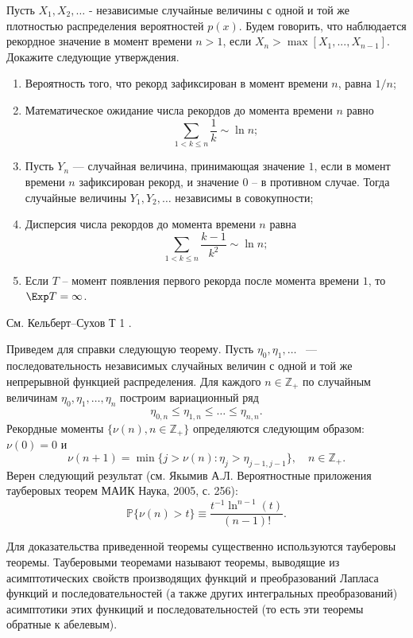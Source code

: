 \begin{problem}[Рекорды]
Пусть $X_1 ,X_2 ,\ldots $ - независимые 
случайные величины с одной и той же плотностью распределения вероятностей 
$p(x)$. Будем говорить, что наблюдается рекордное значение в момент времени 
$n>1$, если $X_n >\max \left[ {X_1 ,...,X_{n-1} } \right]$. Докажите 
следующие утверждения.

\begin{enumerate}
\item Вероятность того, что рекорд зафиксирован в момент времени $n$, 
равна $1/n$;

\item Математическое ожидание числа рекордов до момента времени $n$ 
равно 
\[
\sum\limits_{1<k\le n} {\frac{1}{k}} \sim \ln n;
\]

\item Пусть $Y_n $ --- случайная величина, принимающая значение $1$, если 
в момент времени $n$ зафиксирован рекорд, и значение $0$ -- в противном случае. 
Тогда случайные величины $Y_1 ,Y_2 ,\ldots$ независимы в совокупности;

\item Дисперсия числа рекордов до момента времени $n$ равна
\[
\sum\limits_{1<k\le n} {\frac{k-1}{k^2}} \sim \ln n;
\]

\item Если $T$ -- момент появления первого рекорда после момента времени $1$, то $\Exp T= \infty$.
\end{enumerate}
\end{problem}

\begin{ordre}
См. Кельберт--Сухов Т 1 \cite{4}.
\end{ordre}

\begin{remark}
Приведем для справки следующую теорему. Пусть $\eta_0,\eta_1,\dots$ ~--- последовательность независимых случайных величин с одной и той же непрерывной функцией распределения. Для каждого $n\in \mathbb{Z}_{+}$ по случайным величинам $\eta_0,\eta_1,\dots,\eta_n$ построим вариационный ряд 
$$\eta_{0,n}\leq \eta_{1,n}\leq\dots\leq\eta_{n,n}.$$
Рекордные моменты $\{\nu(n),n\in\mathbb{Z}_{+}\}$ определяются следующим образом: $\nu(0) = 0$ и
$$\nu(n+1)=\min\{j>\nu(n): \eta_j>\eta_{j-1,j-1}\},\quad n\in \mathbb{Z}_{+}.$$
Верен следующий результат (см. Якымив А.Л. Вероятностные приложения тауберовых теорем МАИК Наука, 2005, с. 256):
$$\mathbb{P}\{\nu(n)>t\}\equiv \frac{t^{-1}\ln^{n-1}(t)}{(n-1)!}.$$

\medskip

Для доказательства приведенной теоремы существенно используются тауберовы теоремы.
Тауберовыми теоремами называют теоремы, выводящие из асимптотических свойств производящих функций и преобразований Лапласа функций и последовательностей  (а также других интегральных преобразований) асимптотики этих функиций и последовательностей (то есть эти теоремы обратные к абелевым). 
\end{remark}

